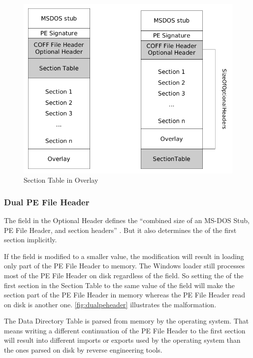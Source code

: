 \begin{figure}
\includegraphics[width=.98\textwidth, height=.60\textheight,keepaspectratio]{graphics/overlaysectable}
\caption{Section Table in Overlay }
\label{fig:overlaysectable} 
\end{figure}

\subsubsection*{Dual PE File Header} \label{subsubsec:dualheader}

The  field in the Optional Header defines the \enquote{combined size of an MS-DOS Stub, PE File Header, and section headers} \cite[]{pespec}. But it also determines the \VA{} of the first section implicitly. \cite[slide 15]{vuksan11} 

If the  field is modified to a smaller value, the modification will result in loading only part of the PE File Header to memory. The Windows loader still processes most of the PE File Header on disk regardless of the  field. So setting the \VA{} of the first section in the Section Table to the same value of the  field will make the section part of the PE File Header in memory whereas the PE File Header read on disk is another one. \autoref{fig:dualpeheader} illustrates the malformation.

The Data Directory Table is parsed from memory by the operating system. That means writing a different continuation of the PE File Header to the first section will result into \eg{} different imports or exports used by the operating system than the ones parsed on disk by reverse engineering tools.

